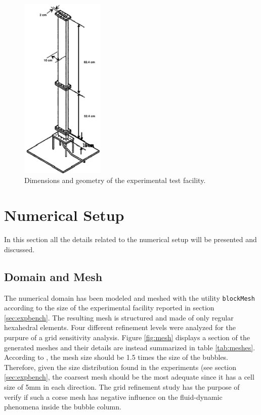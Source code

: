 \documentclass[11pt,a4paper]{article}
\begin{document}
\begin{figure}[!ht]
\centering
\includegraphics[width=4cm]{Report/Images/test facility.png}%
\caption{Dimensions and geometry of the experimental test facility.}
\label{fig:facility}
\end{figure}

\section{Numerical Setup}
\label{sec:numsetup}
In this section all the details related to the numerical setup will be presented and discussed.




\subsection{Domain and Mesh}
\label{sub:domain}
The numerical domain has been modeled and meshed with the utility \texttt{blockMesh} according to the size of the experimental facility reported in section \ref{sec:expbench}. The resulting mesh is structured and made of only regular hexahedral elements. Four different refinement levels were analyzed for the purpure of a grid sensitivity analysis. Figure \ref{fig:mesh} displays a section of the generated meshes and their details are instead summarized in table \ref{tab:meshes}. According to \cite{krepper}, the mesh size should be 1.5 times the size of the bubbles. Therefore, given the size distribution found in the experiments (see section \ref{sec:expbench},  the coarsest mesh should be the most adequate since it has a cell size of 5mm in each direction. The grid refinement study has the purpose of verify if such a corse mesh has  negative influence on the fluid-dynamic phenomena inside the bubble column.
\end{document}
